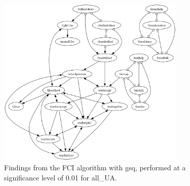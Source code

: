 \begin{figure}[htbp]
    \centering
    \includegraphics[width=0.8\textwidth]{FCI_gsq_0.01_all_UA.png}
    \caption{Findings from the FCI algorithm with gsq, performed at a significance level of 0.01 for all_UA.}
    \label{fig:fci_gsq_0.01all_UA}
\end{figure}
